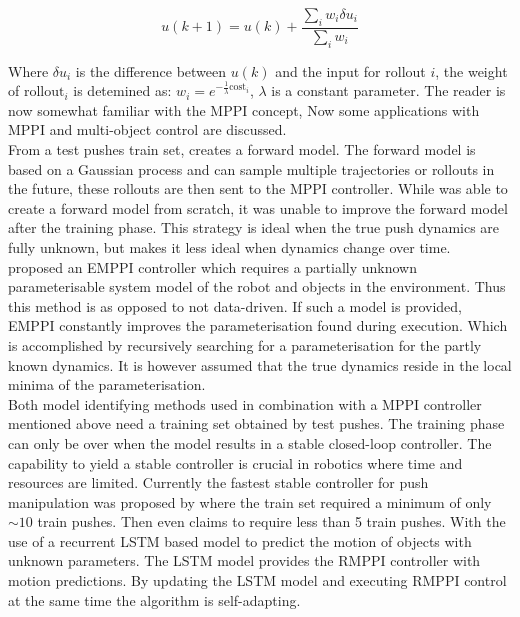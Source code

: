 \begin{equation}
u(k+1)=u(k)+\frac{\sum_{i} w_{i} \delta u_{i}}{\sum_{i} w_{i}}
\label{equation: mppi_weighted_sum}
\end{equation}

Where $\delta u_i$ is the difference between $u(k)$ and the input for rollout $i$, the weight of $\text{rollout}_i$ is detemined as: $w_{i}=e^{-\frac{1}{\lambda} \text{cost}_{i}}$, $\lambda$ is a constant parameter. The reader is now somewhat familiar with the \ac{MPPI} concept, Now some applications with \ac{MPPI} and multi-object control are discussed.\\

From a test pushes train set, \cite{arruda_uncertainty_2017} creates a forward model. The forward model is based on a Gaussian process and can sample multiple trajectories or rollouts in the future, these rollouts are then sent to the \ac{MPPI} controller. While \cite{arruda_uncertainty_2017} was able to create a forward model from scratch, it was unable to improve the forward model after the training phase. This strategy is ideal when the true push dynamics are fully unknown, but makes it less ideal when dynamics change over time.\\

\cite{abraham_model-based_2020} proposed an \ac{EMPPI} controller which requires a partially unknown parameterisable system model of the robot and objects in the environment. Thus this method is as opposed to \cite{arruda_uncertainty_2017} not data-driven. If such a model is provided, \ac{EMPPI} constantly improves the parameterisation found during execution. Which is accomplished by recursively searching for a parameterisation for the partly known dynamics. It is however assumed that the true dynamics reside in the local minima of the parameterisation.\\

Both model identifying methods used in combination with a \ac{MPPI} controller mentioned above need a training set obtained by test pushes. The training phase can only be over when the model results in a stable closed-loop controller. The capability to yield a stable controller is crucial in robotics where time and resources are limited. Currently the fastest stable controller for push manipulation was proposed by \cite{bauza_data-efficient_2018} where the train set required a minimum of only $\sim 10$ train pushes. Then \cite{cong_self-adapting_2020} even claims to require less than 5 train pushes. With the use of a recurrent \ac{LSTM} based model to predict the motion of objects with unknown parameters. The \ac{LSTM}  model provides the \ac{RMPPI} controller with motion predictions. By updating the \ac{LSTM} model and executing \ac{RMPPI} control at the same time the algorithm is self-adapting.\\


